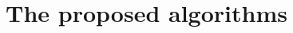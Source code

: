 \documentclass{bmcart}
\newtheorem{definition}{Definition}
\begin{document}

	

 

	\section{The proposed algorithms}\label{sec:rils}
\end{document}
